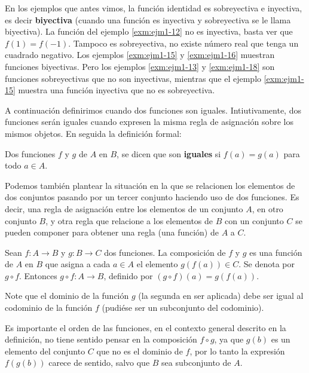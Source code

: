 \documentclass[12pt,]{krantz}
\theoremstyle{definition}
\theoremstyle{definition}
\theoremstyle{definition}
\theoremstyle{remark}
\let\BeginKnitrBlock\begin \let\EndKnitrBlock\end
\begin{document}
En los ejemplos que antes vimos, la función identidad es sobreyectiva e
inyectiva, es decir \textbf{biyectiva} (cuando una función es inyectiva
y sobreyectiva se le llama biyectiva). La función del ejemplo
\ref{exm:ejm1-12} no es inyectiva, basta ver que \(f(1)=f(-1)\). Tampoco
es sobreyectiva, no existe número real que tenga un cuadrado negativo.
Los ejemplos \ref{exm:ejm1-15} y \ref{exm:ejm1-16} muestran funciones
biyectivas. Pero los ejemplos \ref{exm:ejm1-13} y \ref{exm:ejm1-18} son
funciones sobreyectivas que no son inyectivas, mientras que el ejemplo
\ref{exm:ejm1-15} muestra una función inyectiva que no es sobreyectiva.

A continuación definirimos cuando dos funciones son iguales.
Intiutivamente, dos funciones serán iguales cuando expresen la misma
regla de asignación sobre los mismos objetos. En seguida la definición
formal:

\BeginKnitrBlock{definition}
\protect\hypertarget{def:unnamed-chunk-34}{}{\label{def:unnamed-chunk-34}
}Dos funciones \(f\) y \(g\) de \(A\) en \(B\), se dicen que son
\textbf{iguales} si \(f(a)=g(a)\) para todo \(a\in A\).
\EndKnitrBlock{definition}

Podemos también plantear la situación en la que se relacionen los
elementos de dos conjuntos pasando por un tercer conjunto haciendo uso
de dos funciones. Es decir, una regla de asignación entre los elementos
de un conjunto \(A\), en otro conjunto \(B\), y otra regla que relacione
a los elementos de \(B\) con un conjunto \(C\) se pueden componer para
obtener una regla (una función) de \(A\) a \(C\).

\BeginKnitrBlock{definition}
\protect\hypertarget{def:unnamed-chunk-35}{}{\label{def:unnamed-chunk-35}
}Sean \(f:A\longrightarrow B\) y \(g:B\longrightarrow C\) dos funciones.
La composición de \(f\) y \(g\) es una función de \(A\) en \(B\) que
asigna a cada \(a\in A\) el elemento \(g(f(a))\in C\). Se denota por
\(g\circ f\). Entonces \(g\circ f: A\longrightarrow B\), definido por
\((g\circ f)(a)=g(f(a))\).
\EndKnitrBlock{definition}

\BeginKnitrBlock{remark}
{}Note que el dominio de la función \(g\) (la
segunda en ser aplicada) debe ser igual al codominio de la función \(f\)
(pudiése ser un subconjunto del codominio).

Es importante el orden de las funciones, en el contexto general descrito
en la definición, no tiene sentido pensar en la composición
\(f\circ g\), ya que \(g(b)\) es un elemento del conjunto \(C\) que no
es el dominio de \(f\), por lo tanto la expresión \(f(g(b))\) carece de
sentido, salvo que \(B\) sea subconjunto de \(A\).
\EndKnitrBlock{remark}
\end{document}
